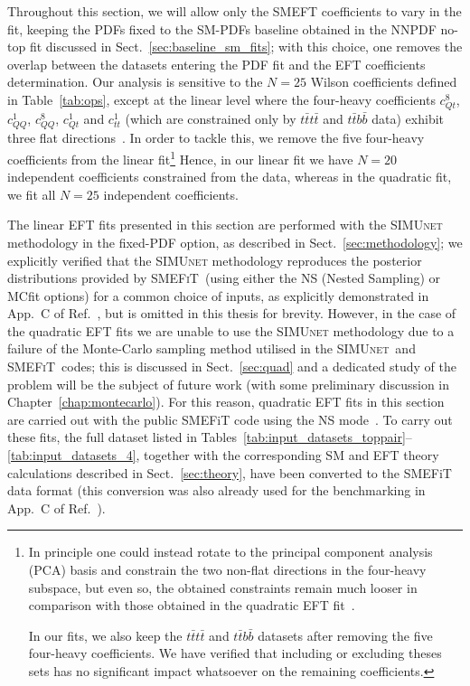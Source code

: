 \documentclass[withindex,glossary]{cam-thesis}
\newcommand{\simunet}{\textsc{SIMUnet}}
\newcommand{\smefit}{\textsc{SMEFiT}}
\begin{document}
Throughout this section, we will allow only the SMEFT coefficients to vary in the fit,
keeping the PDFs fixed to the SM-PDFs baseline obtained in the
NNPDF no-top 
fit discussed in Sect.~\ref{sec:baseline_sm_fits}; with this choice, one removes the overlap
between the datasets entering the PDF fit and the EFT coefficients determination.
%
Our analysis is sensitive to the $N=25$ Wilson coefficients defined
in Table~\ref{tab:ops}, except at the linear level where the four-heavy
coefficients $c_{Qt}^{8}$, $c_{QQ}^{1}$, $c_{QQ}^{8}$, $c_{Qt}^{1}$ and $c_{tt}^{1}$ (which are 
constrained only by $t\bar{t}t\bar{t}$ and $t\bar{t}b\bar{b}$ data)
exhibit three flat directions~\cite{Ethier:2021bye}. In order to tackle this, we remove the five four-heavy coefficients from the linear fit\footnote{In principle one could instead rotate to the principal component analysis (PCA) basis
  and constrain the two non-flat directions in the four-heavy subspace,
  but even so, the obtained constraints
  remain much looser in comparison with those obtained in the quadratic EFT fit~\cite{Ethier:2021bye}. 
  
  In our fits, we also keep the $t\bar{t} t\bar{t}$ and $t\bar{t} b \bar{b}$ datasets after removing the five four-heavy coefficients. We 
  have verified that including or excluding theses sets has no
  significant impact whatsoever on the remaining coefficients.
}
%
Hence, in our linear fit we have $N=20$ independent coefficients constrained
from the data, whereas in the quadratic fit, we fit all $N=25$ independent coefficients.

The linear EFT fits presented in this section are performed with the \simunet{}  methodology
in the fixed-PDF option, as described in Sect.~\ref{sec:methodology}; 
we explicitly verified that the \simunet{} methodology reproduces the posterior distributions 
provided by \smefit{}~(using
either the NS (Nested Sampling) or MCfit options)
for a common choice of inputs, as explicitly demonstrated in App.~C of Ref.~\cite{Kassabov:2023hbm}, but is omitted
in this thesis for brevity.
%
However, in the case of the quadratic EFT fits we are unable to use the \simunet{} 
methodology due to a failure of the Monte-Carlo sampling method utilised in the \simunet{}~and \smefit{}~codes;
this is discussed in Sect.~\ref{sec:quad} and a dedicated study of the problem will be the subject of future work
(with some preliminary discussion in Chapter~\ref{chap:montecarlo}).
%
For this reason, quadratic EFT fits in this section are carried out
with the public {\sc\small SMEFiT} code using the NS
mode~\cite{Giani:2023gfq}. 
%
To carry out these fits, the full dataset listed in
Tables~\ref{tab:input_datasets_toppair}--\ref{tab:input_datasets_4}, together
with the corresponding SM and EFT theory calculations described in Sect.~\ref{sec:theory},
have been converted to the {\sc\small SMEFiT} data format (this conversion
was also already used for the benchmarking in App.~C of Ref.~\cite{Kassabov:2023hbm}).
\end{document}
